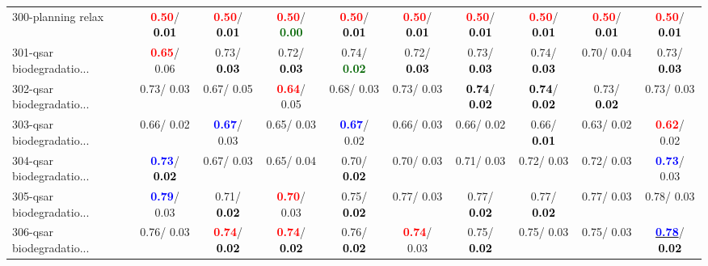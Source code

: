 \begin{table}[h]
\begin{center}
{\begin{tabular}{lc|c|c|c|c|c|c|c|c}
300-planning relax & \textcolor{red}{\textbf{  0.50}}/\textcolor{black}{\textbf{  0.01}} & \textcolor{red}{\textbf{  0.50}}/\textcolor{black}{\textbf{  0.01}} & \textcolor{red}{\textbf{  0.50}}/\textcolor{darkgreen}{\textbf{  0.00}} & \textcolor{red}{\textbf{  0.50}}/\textcolor{black}{\textbf{  0.01}} & \textcolor{red}{\textbf{  0.50}}/\textcolor{black}{\textbf{  0.01}} & \textcolor{red}{\textbf{  0.50}}/\textcolor{black}{\textbf{  0.01}} & \textcolor{red}{\textbf{  0.50}}/\textcolor{black}{\textbf{  0.01}} & \textcolor{red}{\textbf{  0.50}}/\textcolor{black}{\textbf{  0.01}} & \textcolor{red}{\textbf{  0.50}}/\textcolor{black}{\textbf{  0.01}} \\
301-qsar biodegradatio... & \textcolor{red}{\textbf{  0.65}}/  0.06 &   0.73/\textcolor{black}{\textbf{  0.03}} &   0.72/\textcolor{black}{\textbf{  0.03}} &   0.74/\textcolor{darkgreen}{\textbf{  0.02}} &   0.72/\textcolor{black}{\textbf{  0.03}} &   0.73/\textcolor{black}{\textbf{  0.03}} &   0.74/\textcolor{black}{\textbf{  0.03}} &   0.70/  0.04 &   0.73/\textcolor{black}{\textbf{  0.03}} \\
302-qsar biodegradatio... &   0.73/  0.03 &   0.67/  0.05 & \textcolor{red}{\textbf{  0.64}}/  0.05 &   0.68/  0.03 &   0.73/  0.03 & \textcolor{black}{\textbf{  0.74}}/\textcolor{black}{\textbf{  0.02}} & \textcolor{black}{\textbf{  0.74}}/\textcolor{black}{\textbf{  0.02}} &   0.73/\textcolor{black}{\textbf{  0.02}} &   0.73/  0.03 \\ \hline
303-qsar biodegradatio... &   0.66/  0.02 & \textcolor{blue}{\textbf{  0.67}}/  0.03 &   0.65/  0.03 & \textcolor{blue}{\textbf{  0.67}}/  0.02 &   0.66/  0.03 &   0.66/  0.02 &   0.66/\textcolor{black}{\textbf{  0.01}} &   0.63/  0.02 & \textcolor{red}{\textbf{  0.62}}/  0.02 \\
304-qsar biodegradatio... & \textcolor{blue}{\textbf{  0.73}}/\textcolor{black}{\textbf{  0.02}} &   0.67/  0.03 &   0.65/  0.04 &   0.70/\textcolor{black}{\textbf{  0.02}} &   0.70/  0.03 &   0.71/  0.03 &   0.72/  0.03 &   0.72/  0.03 & \textcolor{blue}{\textbf{  0.73}}/  0.03 \\
305-qsar biodegradatio... & \textcolor{blue}{\textbf{  0.79}}/  0.03 &   0.71/\textcolor{black}{\textbf{  0.02}} & \textcolor{red}{\textbf{  0.70}}/  0.03 &   0.75/\textcolor{black}{\textbf{  0.02}} &   0.77/  0.03 &   0.77/\textcolor{black}{\textbf{  0.02}} &   0.77/\textcolor{black}{\textbf{  0.02}} &   0.77/  0.03 &   0.78/  0.03 \\
306-qsar biodegradatio... &   0.76/  0.03 & \textcolor{red}{\textbf{  0.74}}/\textcolor{black}{\textbf{  0.02}} & \textcolor{red}{\textbf{  0.74}}/\textcolor{black}{\textbf{  0.02}} &   0.76/\textcolor{black}{\textbf{  0.02}} & \textcolor{red}{\textbf{  0.74}}/  0.03 &   0.75/\textcolor{black}{\textbf{  0.02}} &   0.75/  0.03 &   0.75/  0.03 & \underline{\textcolor{blue}{\textbf{  0.78}}}/\textcolor{black}{\textbf{  0.02}} \\

\end{tabular}}
\end{center}
\end{table}
